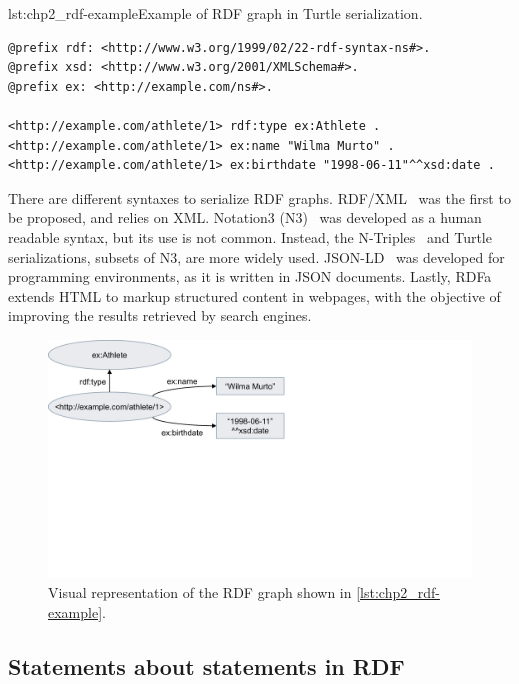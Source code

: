 \begin{minipage}{\textwidth}
\begin{captionedlisting}{lst:chp2_rdf-example}{Example of RDF graph in Turtle serialization.}
\centering
{\begin{lstlisting}[language=r2rml]
@prefix rdf: <http://www.w3.org/1999/02/22-rdf-syntax-ns#>.
@prefix xsd: <http://www.w3.org/2001/XMLSchema#>.
@prefix ex: <http://example.com/ns#>.

<http://example.com/athlete/1> rdf:type ex:Athlete .
<http://example.com/athlete/1> ex:name "Wilma Murto" .
<http://example.com/athlete/1> ex:birthdate "1998-06-11"^^xsd:date .
\end{lstlisting}}
\end{captionedlisting}
\end{minipage}

There are different syntaxes to serialize RDF graphs. RDF/XML~\parencite{rdfxml} was the first to be proposed, and relies on XML. Notation3 (N3)~\parencite{notation3} was developed as a human readable syntax, but its use is not common. Instead, the N-Triples~\parencite{ntriples} and Turtle~\parencite{turtle} serializations, subsets of N3, are more widely used. JSON-LD~\parencite{jsonld} was developed for programming environments, as it is written in JSON documents. Lastly, RDFa~\parencite{rdfa} extends HTML to markup structured content in webpages, with the objective of improving the results retrieved by search engines. 



\begin{figure}[t]
\centering
\includegraphics[width=0.6\linewidth]{figures/chp2_rdf-example.pdf}
\caption[RDF graph example]{Visual representation of the RDF graph shown in \cref{lst:chp2_rdf-example}.}
\label{fig:chp2_rdf-example}
\end{figure}

\subsection{Statements about statements in RDF}
\label{sec:chp2_reifications}

